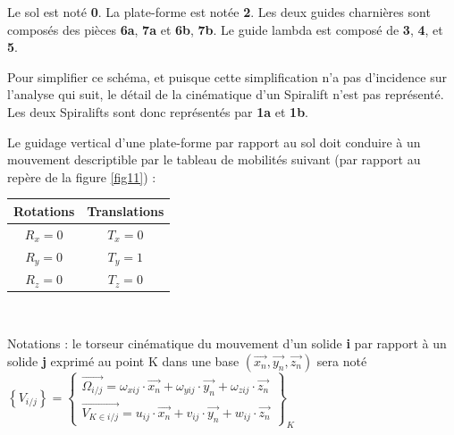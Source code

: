 Le sol est noté \textbf{0}. La plate-forme est notée \textbf{2}. Les deux guides charnières sont composés des pièces {\textbf{6a}, \textbf{7a}} et {\textbf{6b}, \textbf{7b}}. Le guide lambda est composé de \textbf{3}, \textbf{4}, et \textbf{5}.

Pour simplifier ce schéma, et puisque cette simplification n'a pas d'incidence sur l'analyse qui suit, le détail de la cinématique d'un Spiralift n'est pas représenté. Les deux Spiralifts sont donc représentés par \textbf{1a} et \textbf{1b}.




Le guidage vertical d'une plate-forme par rapport au sol doit conduire à un mouvement descriptible par le tableau de mobilités suivant (par rapport au repère de la figure \ref{fig11}) :

\begin{center}
\begin{tabular}{|c|c|}
\hline
Rotations & Translations \\
\hline
$R_x=0$ & $T_x=0$ \\
\hline
$R_y=0$ & $T_y=1$ \\
\hline
$R_z=0$ & $T_z=0$ \\
\hline
\end{tabular}
\end{center}


~\

Notations : le torseur cinématique du mouvement d'un solide \textbf{i} par rapport à un solide \textbf{j} exprimé au
point K dans une base $\left(\overrightarrow{x_n},\overrightarrow{y_n},\overrightarrow{z_n}\right)$ sera noté
$\left\{V_{i/j}\right\}=\left\{\begin{array}{c}\overrightarrow{\Omega_{i/j}}=\omega_{xij}\cdot \overrightarrow{x_n}+\omega_{yij}\cdot \overrightarrow{y_n}+\omega_{zij}\cdot \overrightarrow{z_n} \\
\overrightarrow{V_{K\in i/j}}=u_{ij}\cdot \overrightarrow{x_n}+v_{ij}\cdot \overrightarrow{y_n}+w_{ij}\cdot \overrightarrow{z_n}
\end{array}\right\}_K$

